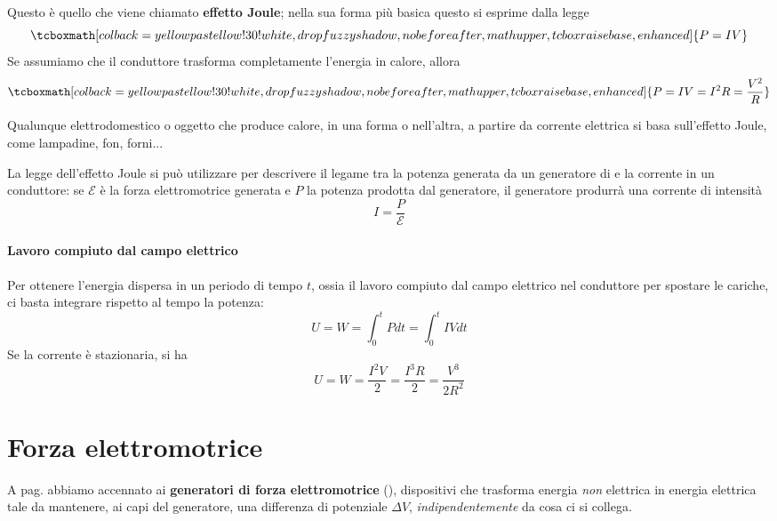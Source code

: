 Questo è quello che viene chiamato \textbf{effetto Joule}; nella sua forma più basica questo si esprime dalla legge
\begin{equation}
	\tcboxmath[colback=yellowpastellow!30!white,drop fuzzy shadow, nobeforeafter, math upper, tcbox raise base, enhanced]{P=IV}
\end{equation}
Se assumiamo che il conduttore trasforma completamente l'energia in calore, allora
\begin{equation}
	\tcboxmath[colback=yellowpastellow!30!white,drop fuzzy shadow, nobeforeafter, math upper, tcbox raise base, enhanced]{P=IV=I^2R=\frac{V^2}{R}}
\end{equation}
\begin{example}
	Qualunque elettrodomestico o oggetto che produce calore, in una forma o nell'altra, a partire da corrente elettrica si basa sull'effetto Joule, come lampadine, fon, forni...
\end{example}
\begin{observe}
	La legge dell'effetto Joule si può utilizzare per descrivere il legame tra la potenza generata da un generatore di \fem e la corrente in un conduttore: se $\mathcal{E}$ è la forza elettromotrice generata e $P$ la potenza prodotta dal generatore, il generatore produrrà una corrente di intensità
	\begin{equation}
		I=\frac{P}{\mathcal{E}}
	\end{equation}
\end{observe}
\paragraph{Lavoro compiuto dal campo elettrico}
Per ottenere l'energia dispersa in un periodo di tempo $t$, ossia il lavoro compiuto dal campo elettrico nel conduttore per spostare le cariche, ci basta integrare rispetto al tempo la potenza:
\begin{equation}
	U=W=\int_{0}^{t}Pdt=\int_{0}^t IVdt
\end{equation}
Se la corrente è stazionaria, si ha
\begin{equation}
	U=W=\frac{I^2V}{2}=\frac{I^3R}{2}=\frac{V^3}{2R^2}
\end{equation}
\section{Forza elettromotrice}\label{femxesteso}
A pag. \pageref{fem} abbiamo accennato ai \textbf{generatori di forza elettromotrice} (\fem), dispositivi che trasforma energia \textit{non} elettrica in energia elettrica tale da mantenere, ai capi del generatore, una differenza di potenziale $\Delta V$, \textit{indipendentemente} da cosa ci si collega.

